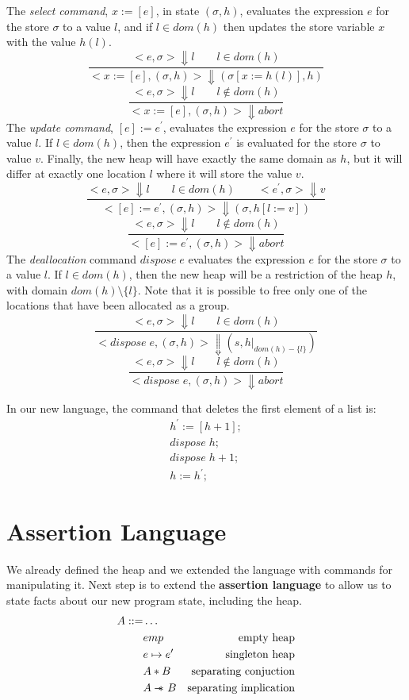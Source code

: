 \documentclass[12pt]{article}
\newcommand{\sep}{-\kern-.6em\raisebox{-.659ex}{*}\ }
\begin{document}
The \textit{select command}, $x := [e]$, in state $(\sigma,h)$, evaluates the expression $e$ for the store $\sigma$ to a value $l$, and if $l \in dom(h)$ then updates the store variable $x$ with the value $h(l)$. 
\[ \frac{<e,\sigma>\Downarrow l\qquad l \in dom(h)} {<x := [e],(\sigma,h)>\Downarrow (\sigma[x:=h(l)],h)}\]
\[ \frac{<e,\sigma>\Downarrow l\qquad l \notin dom(h)} {<x := [e],(\sigma,h)>\Downarrow abort}\]
The \textit{update command}, $[e]:=e^\prime$, evaluates the expression $e$ for the store $\sigma$ to a value $l$. If $l \in dom(h)$, then the expression $e^\prime$ is evaluated for the store $\sigma$ to value $v$. Finally, the new heap will have exactly the same domain as $h$, but it will differ at exactly one location $l$ where it will store the value $v$.
\[
\frac{<e,\sigma>\Downarrow l \qquad l \in dom(h) \qquad <e^\prime,\sigma>\Downarrow v}{<[e]:=e^\prime,(\sigma,h)>\Downarrow (\sigma,h[l:=v])}
\]
\[
\frac{<e,\sigma>\Downarrow l \qquad l \notin dom(h) }{<[e]:=e^\prime,(\sigma,h)>\Downarrow abort}
\]
The \textit{deallocation} command $dispose \; e$ evaluates the expression $e$ for the store $\sigma$ to a value $l$. If $l \in dom(h)$, then the new heap will be a restriction of the heap $h$, with domain $dom(h) \setminus \{l\}$. 
Note that it is possible to free only one of the locations that have been allocated as a group.
\[
\frac{<e,\sigma> \Downarrow l \qquad l\in dom(h)}{<dispose \; e,(\sigma,h)>\Downarrow(s,h|_{dom(h)-\{l\}})}
\]
\[
\frac{<e,\sigma> \Downarrow l \qquad l\notin dom(h)}{<dispose \; e,(\sigma,h)>\Downarrow abort}
\]

In our new language, the command that deletes the first element of a list is:
\begin{align*}
&h^\prime:=[h+1];\\
&dispose \; h;\\
&dispose \; h+1; &\\
&h:=h^\prime;
\end{align*}

\section{Assertion Language} \label{sec:assertions}

We already defined the heap and we extended the language with commands for manipulating it. Next step is to extend the \textbf{assertion language} to allow us to state facts about our new program state, including the heap.
\begin{align*}
A ::=& \dots &\\
&emp & \mbox{empty heap}\\
&e \mapsto e^\prime & \mbox{singleton heap}\\
& A * B & \mbox{separating conjuction}\\
& A \sep B & \mbox{separating implication}
\end{align*}
\end{document}
